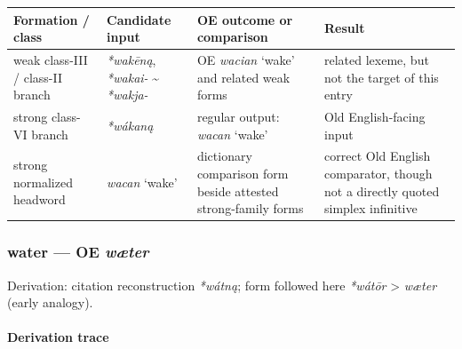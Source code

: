 \documentclass[
  british,
  a4paper,
]{article}
\newcounter{none} %
\begin{document}
{\def\LTcaptype{none} %
\begin{longtable}[]{@{}
  >{\raggedright\arraybackslash}p{}
  >{\raggedright\arraybackslash}p{}
  >{\raggedright\arraybackslash}p{}
  >{\raggedright\arraybackslash}p{}@{}}
\toprule\noalign{}
\begin{minipage}[b]{\linewidth}\raggedright
Formation / class
\end{minipage} & \begin{minipage}[b]{\linewidth}\raggedright
Candidate input
\end{minipage} & \begin{minipage}[b]{\linewidth}\raggedright
OE outcome or comparison
\end{minipage} & \begin{minipage}[b]{\linewidth}\raggedright
Result
\end{minipage} \\
\midrule\noalign{}
\endhead
\bottomrule\noalign{}
\endlastfoot
weak class-III / class-II branch & {\emph{*wakēną}}, \emph{*wakai-}
\textasciitilde{} \emph{*wakja-} & OE {\emph{wacian}} `wake' and related
weak forms & related lexeme, but not the target of this entry \\
strong class-VI branch & {\emph{*wákaną}} & regular output:
{\emph{wacan}} `wake' & Old English-facing input \\
strong normalized headword & {\emph{wacan}} `wake' & dictionary
comparison form beside attested strong-family forms & correct Old
English comparator, though not a directly quoted simplex infinitive \\
\end{longtable}
}

\subsubsection{\texorpdfstring{water --- OE
\emph{wæter}}{water --- OE wæter}}\label{water-oe-wuxe6ter}

Derivation: citation reconstruction \emph{*wátną}; form followed here
\emph{*wátōr} \textgreater{} \emph{wæter} (early analogy).

\paragraph{Derivation trace}\label{derivation-trace-141}
\end{document}
